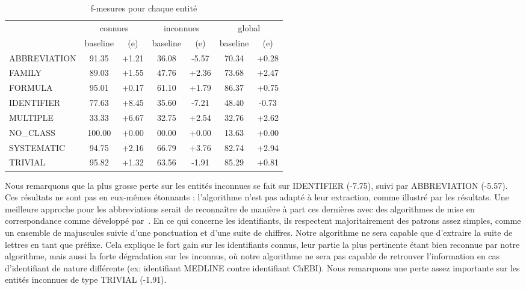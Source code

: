 \documentclass[PhD-Yoann-Dupont.tex]{subfiles}
\begin{document}
\begin{table}[ht!]
\centering
\begin{tabular}{|l|cc|cc|cc|}
\cline{2-7}
\multicolumn{1}{l|}{}   & \multicolumn{2}{|c|}{connues} & \multicolumn{2}{|c|}{inconnues} & \multicolumn{2}{|c|}{global} \\
\multicolumn{1}{l|}{}   & baseline & (e)                & baseline & (e)                  & baseline & (e) \\
\hline
ABBREVIATION            & 91.35    & +1.21              & 36.08    & -5.57                & 70.34    & +0.28 \\
FAMILY                  & 89.03    & +1.55              & 47.76    & +2.36                & 73.68    & +2.47 \\
FORMULA                 & 95.01    & +0.17              & 61.10    & +1.79                & 86.37    & +0.75 \\
IDENTIFIER              & 77.63    & +8.45              & 35.60    & -7.21                & 48.40    & -0.73 \\
MULTIPLE                & 33.33    & +6.67              & 32.75    & +2.54                & 32.76    & +2.62 \\
NO\_CLASS               & 100.00   & +0.00              & 00.00    & +0.00                & 13.63    & +0.00 \\
SYSTEMATIC              & 94.75    & +2.16              & 66.79    & +3.76                & 82.74    & +2.94 \\
TRIVIAL                 & 95.82    & +1.32              & 63.56    & -1.91                & 85.29    & +0.81 \\
\hline
\end{tabular}
\caption{f-mesures pour chaque entité}
\label{tab:entity-fscores}
\end{table}

Nous remarquons que la plus grosse perte sur les entités inconnues se fait sur IDENTIFIER (-7.75), suivi par ABBREVIATION (-5.57). Ces résultats ne sont pas en eux-mêmes étonnants : l'algorithme n'est pas adapté à leur extraction, comme illustré par les résultats. Une meilleure approche pour les abbreviations serait de reconnaître de manière à part ces dernières avec des algorithmes de mise en correspondance comme développé par\ \citet{hearst2003simple}. En ce qui concerne les identifiants, ils respectent majoritairement des patrons assez simples, comme un ensemble de majuscules suivie d'une ponctuation et d'une suite de chiffres. Notre algorithme ne sera capable que d'extraire la suite de lettres en tant que préfixe. Cela explique le fort gain sur les identifiants connus, leur partie la plus pertinente étant bien reconnue par notre algorithme, mais aussi la forte dégradation sur les inconnus, où notre algorithme ne sera pas capable de retrouver l'information en cas d'identifiant de nature différente (ex: identifiant MEDLINE contre identifiant ChEBI). Nous remarquons une perte assez importante sur les entités inconnues de type TRIVIAL (-1.91).
\end{document}

